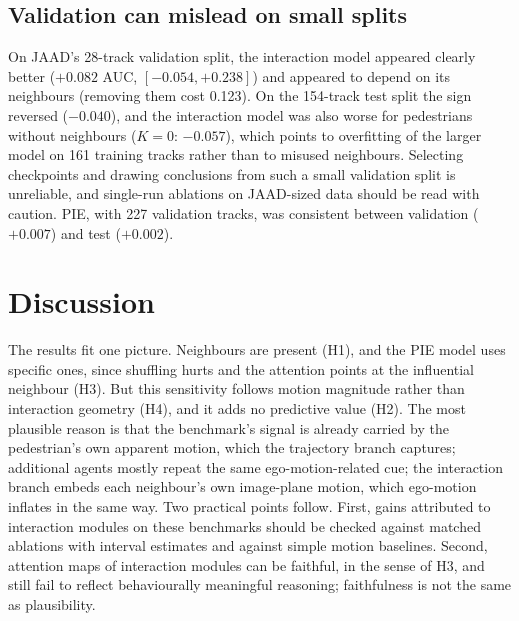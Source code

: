 \documentclass[conference]{IEEEtran}
\begin{document}
\subsection{Validation can mislead on small splits}\label{sec:rev}
On JAAD's 28-track validation split, the interaction model appeared clearly better ($+0.082$ AUC, $[-0.054, +0.238]$) and appeared to depend on its neighbours (removing them cost 0.123). On the 154-track test split the sign reversed ($-0.040$), and the interaction model was also worse for pedestrians without neighbours ($K=0$: $-0.057$), which points to overfitting of the larger model on 161 training tracks rather than to misused neighbours. Selecting checkpoints and drawing conclusions from such a small validation split is unreliable, and single-run ablations on JAAD-sized data should be read with caution. PIE, with 227 validation tracks, was consistent between validation ($+0.007$) and test ($+0.002$).

\section{Discussion}
The results fit one picture. Neighbours are present (H1), and the PIE model uses specific ones, since shuffling hurts and the attention points at the influential neighbour (H3). But this sensitivity follows motion magnitude rather than interaction geometry (H4), and it adds no predictive value (H2). The most plausible reason is that the benchmark's signal is already carried by the pedestrian's own apparent motion, which the trajectory branch captures; additional agents mostly repeat the same ego-motion-related cue; the interaction branch embeds each neighbour's own image-plane motion, which ego-motion inflates in the same way. Two practical points follow. First, gains attributed to interaction modules on these benchmarks should be checked against matched ablations with interval estimates and against simple motion baselines. Second, attention maps of interaction modules can be faithful, in the sense of H3, and still fail to reflect behaviourally meaningful reasoning; faithfulness is not the same as plausibility.
\end{document}

